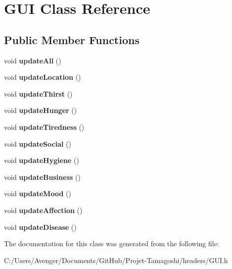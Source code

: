 \hypertarget{class_g_u_i}{\section{G\+U\+I Class Reference}
\label{class_g_u_i}
}
\subsection*{Public Member Functions}
\begin{DoxyCompactItemize}
\item 
\hypertarget{class_g_u_i_aa60a2f7feb8ece1d6caa2e8bb4236aa4}{void {\bfseries update\+All} ()}\label{class_g_u_i_aa60a2f7feb8ece1d6caa2e8bb4236aa4}

\item 
\hypertarget{class_g_u_i_ac56927bd6744e33206aba96ba72526aa}{void {\bfseries update\+Location} ()}\label{class_g_u_i_ac56927bd6744e33206aba96ba72526aa}

\item 
\hypertarget{class_g_u_i_a70aa39ef4e438747983bb9ed31cbf457}{void {\bfseries update\+Thirst} ()}\label{class_g_u_i_a70aa39ef4e438747983bb9ed31cbf457}

\item 
\hypertarget{class_g_u_i_a0c922d41e885d1f15513d6021b457e64}{void {\bfseries update\+Hunger} ()}\label{class_g_u_i_a0c922d41e885d1f15513d6021b457e64}

\item 
\hypertarget{class_g_u_i_a1316a05b6355427053e6b02442ee6103}{void {\bfseries update\+Tiredness} ()}\label{class_g_u_i_a1316a05b6355427053e6b02442ee6103}

\item 
\hypertarget{class_g_u_i_a8dc0d3e524049f1dd89f33b72a3693fc}{void {\bfseries update\+Social} ()}\label{class_g_u_i_a8dc0d3e524049f1dd89f33b72a3693fc}

\item 
\hypertarget{class_g_u_i_a55683ad4402271dc52ee108d152fb3ec}{void {\bfseries update\+Hygiene} ()}\label{class_g_u_i_a55683ad4402271dc52ee108d152fb3ec}

\item 
\hypertarget{class_g_u_i_ab1e1174edf1ac68f818017287f423573}{void {\bfseries update\+Business} ()}\label{class_g_u_i_ab1e1174edf1ac68f818017287f423573}

\item 
\hypertarget{class_g_u_i_a6c478fb6902b405797523e2b2f02cad3}{void {\bfseries update\+Mood} ()}\label{class_g_u_i_a6c478fb6902b405797523e2b2f02cad3}

\item 
\hypertarget{class_g_u_i_ad9d7f84761cd5fc727d088935a62eddb}{void {\bfseries update\+Affection} ()}\label{class_g_u_i_ad9d7f84761cd5fc727d088935a62eddb}

\item 
\hypertarget{class_g_u_i_a871d662e8bbfddf090a10727727daf59}{void {\bfseries update\+Disease} ()}\label{class_g_u_i_a871d662e8bbfddf090a10727727daf59}

\end{DoxyCompactItemize}


The documentation for this class was generated from the following file\+:\begin{DoxyCompactItemize}
\item 
C\+:/\+Users/\+Avenger/\+Documents/\+Git\+Hub/\+Projet-\/\+Tamagoshi/headers/G\+U\+I.\+h\end{DoxyCompactItemize}
